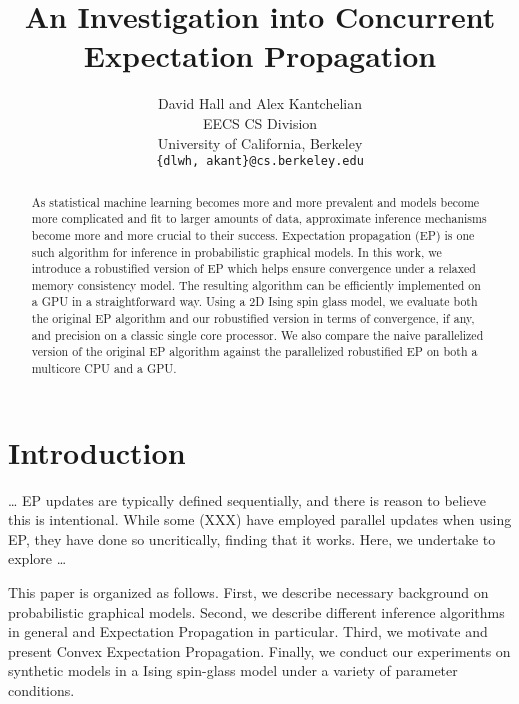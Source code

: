\documentclass[times, 10pt,twocolumn]{article}
\begin{document}
\title{An Investigation into Concurrent Expectation Propagation}

\author{David Hall and Alex Kantchelian \\
EECS CS Division \\ University of California, Berkeley\\ \texttt{\{dlwh,
akant\}@cs.berkeley.edu}\\
}

\maketitle
\thispagestyle{empty}

\begin{abstract}
As statistical machine learning becomes more and more prevalent and models become more complicated and fit to larger amounts of data, approximate inference mechanisms become more and more crucial to their success. Expectation propagation (EP) is one such algorithm for inference in probabilistic graphical models. In this work, we introduce a robustified version of EP which helps ensure convergence under a relaxed memory consistency model. The resulting algorithm can be efficiently implemented on a GPU in a straightforward way. Using a 2D Ising spin glass model, we evaluate both the original EP algorithm and our robustified version in terms of convergence, if any, and precision on a classic single core processor. We also compare the naive parallelized version of the original EP algorithm against the parallelized robustified EP on both a multicore CPU and a GPU.
\end{abstract}



\section{Introduction}

\ldots
EP updates are typically defined sequentially,
and there is reason to believe this is intentional.
While some (XXX) have employed parallel updates when using EP, they
have done so uncritically, finding that it works. Here, we
undertake to explore
\ldots

This paper is organized as follows. First, we describe necessary
background on probabilistic graphical models. Second, we describe
different inference algorithms in general and Expectation Propagation
in particular. Third, we motivate and present Convex Expectation
Propagation. Finally, we conduct our experiments on synthetic
models in a Ising spin-glass model under a variety of parameter
conditions.
\end{document}
